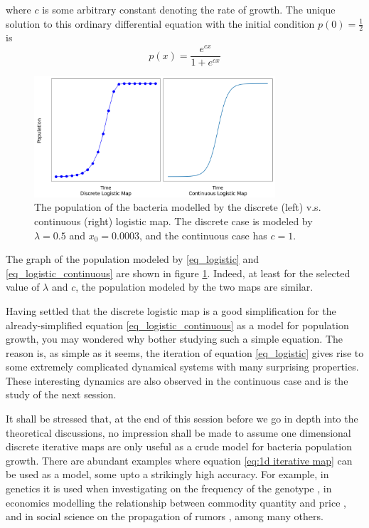 where $c$ is some arbitrary constant denoting the rate of growth. 
The unique solution to this ordinary differential equation with the initial condition $p(0) = \frac{1}{2}$ is 
$$
p(x) = \frac{e^{cx}}{1+e^{cx}}
$$
\begin{figure}
	\centering
	\includegraphics[width=0.8\textwidth]{./figures/con_vs_discrete_logistic_map.png}
	\caption{The population of the bacteria modelled by the discrete (left) v.s. continuous (right) logistic map. 
	The discrete case is modeled by $\lambda = 0.5$ and $x_0 = 0.0003$, and the continuous case has $c=1$.}
	\label{fig:con_vs_discrete}
\end{figure}

The graph of the population modeled by \eqref{eq_logistic} and \eqref{eq_logistic_continuous} are shown in figure \ref{fig:con_vs_discrete}.
Indeed, at least for the selected value of $\lambda$ and $c$, the population modeled by the two maps are similar.

Having settled that the discrete logistic map is a good simplification for the already-simplified equation \ref{eq_logistic_continuous} as a model for population growth, you may wondered why bother studying such a simple equation. 
The reason is, as simple as it seems, the iteration of equation \ref{eq_logistic} gives rise to some extremely complicated dynamical systems with many surprising properties. 
These interesting dynamics are also observed in the continuous case and is the study of the next session.

It shall be stressed that, at the end of this session before we go in depth into the theoretical discussions, no impression shall be made to assume one dimensional discrete iterative maps are only useful as a crude model for bacteria population growth. 
There are abundant examples where equation \eqref{eq:1d iterative map} can be used as a model, some upto a strikingly high accuracy. 
For example, in genetics it is used when investigating on the frequency of the genotype \cite{genotype}, in economics modelling the relationship between commodity quantity and price \cite{economics}, and in social science on the propagation of rumors \cite{social_science}, among many others.


